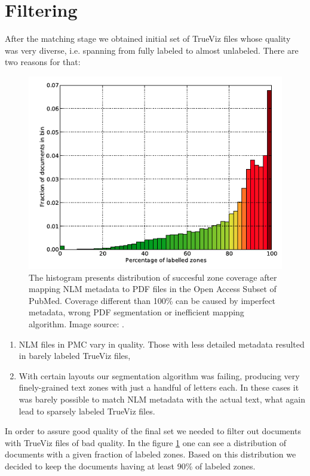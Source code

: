 \section{Filtering}
After the matching stage we obtained initial set of TrueViz files whose quality was very diverse, i.e. spanning from fully labeled to almost unlabeled. There are two reasons for that:
\begin{figure}[ht!]
  \centering
  \includegraphics[width=12cm]{plots/zone_coverage_grotoap2}
  \caption{The histogram presents distribution of succesful zone coverage after mapping NLM metadata to PDF files in the Open Access Subset of PubMed. Coverage different than 100\% can be caused by imperfect metadata, wrong PDF segmentation or inefficient mapping algorithm. Image source: \cite{DominikaTkaczykPaweSzostek2014}.}
  \label{fig:trueviz_match_histogram}
\end{figure}
\begin{enumerate}
\item NLM files in PMC vary in quality. Those with less detailed metadata resulted in barely labeled TrueViz files,
\item With certain layouts our segmentation algorithm was failing, producing very finely-grained text zones with just a handful of letters each. In these cases it was barely possible to match NLM metadata with the actual text, what again lead to sparsely labeled TrueViz files. 
\end{enumerate}
In order to assure good quality of the final set we needed to filter out documents with TrueViz files of bad quality. In the figure \ref{fig:trueviz_match_histogram} one can see a distribution of documents with a given fraction of labeled zones.
Based on this distribution we decided to keep the documents having at least 90\% of labeled zones.

